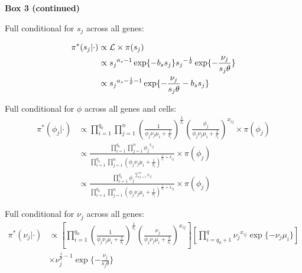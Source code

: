 \newpage

\begin{Comment}
\textbf{Box 3 (continued)}

Full conditional for $s_j$ across all genes:
\begin{fleqn}
\begin{align*}
\pi^*(s_j|\cdot)&\propto{}\mathcal{L}\times\pi(s_j)\\
&\propto{}s_j{}^{a_s-1}\exp\lbrace-b_ss_j\rbrace{}s_j{}^{-\frac{1}{\theta}}\exp\lbrace-\frac{\nu_j}{s_j\theta}\rbrace\\
&\propto{}s_j{}^{a_s-\frac{1}{\theta}-1}\exp\lbrace-\frac{\nu_j}{s_j\theta}-b_ss_j\rbrace
\end{align*}
\end{fleqn}

Full conditional for $\phi$ across all genes and cells:
\begin{align*}
\pi^*(\phi_j|\cdot)&\propto{}\prod_{i=1}^{q_0}\prod_{j=1}^{n}\left(\frac{1}{\phi_j\nu_j\mu_i+\frac{1}{\delta_i}}\right)^\frac{1}{\delta_i}\left(\frac{\phi_j}{\phi_j\nu_j\mu_i+\frac{1}{\delta_i}}\right)^{x_{ij}}\times{}\pi(\phi_j)\\
&\propto{}\frac{\prod_{i=1}^{q_0}\prod_{j=1}^{n}\phi_j{}^{x_{ij}}}{\prod_{i=1}^{q_0}\prod_{j=1}^{n}(\phi_j\nu_j\mu_i+\frac{1}{\delta_i})^{\frac{1}{\delta_i}+x_{ij}}}\times{}\pi(\phi_j)\\
&\propto{}\frac{\prod_{i=1}^{q_0}\phi_j{}^{\sum_{j=1}^nx_{ij}}}{\prod_{i=1}^{q_0}\prod_{j=1}^{n}(\phi_j\nu_j\mu_i+\frac{1}{\delta_i})^{\frac{1}{\delta_i}+x_{ij}}}\times{}\pi(\phi_j)
\end{align*}

Full conditional for $\nu_j$ across all genes:
\begin{align*}
\pi^*(\nu_j|\cdot)&\propto{}\left[\prod_{i=1}^{q_0}\left(\frac{1}{\phi_j\nu_j\mu_i+\frac{1}{\delta_i}}\right)^\frac{1}{\delta_i}\left(\frac{\nu_j}{\phi_j\nu_j\mu_i+\frac{1}{\delta_i}}\right)^{x_{ij}}\right]\left[\prod_{i=q_0+1}^{q}\nu_j{}^{x_{ij}}\exp\lbrace-\nu_j\mu_i\rbrace\right]\\
&\times{}\nu_j^{\frac{1}{\theta}-1}\exp\lbrace-\frac{\nu_j}{s_j\theta}\rbrace
\end{align*}
\end{Comment}

\newpage

